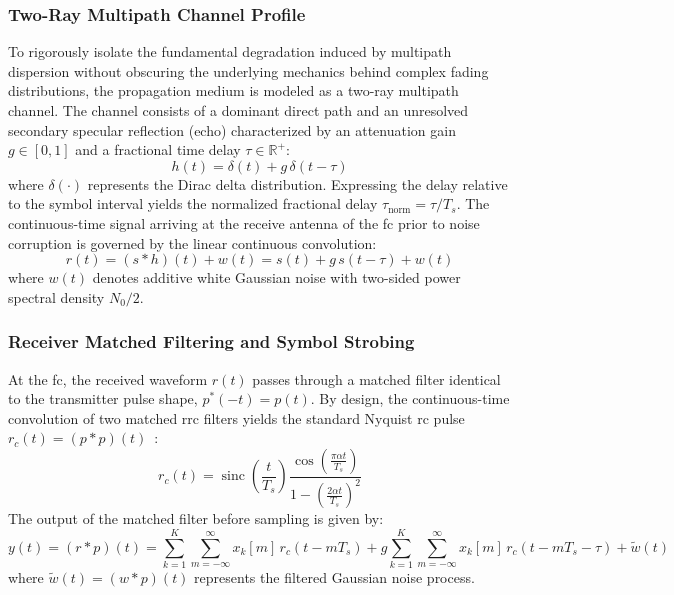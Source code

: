 \documentclass[Markos_Delaportas_1316.tex]{subfiles}
\begin{document}
\subsubsection{Two-Ray Multipath Channel Profile}
\label{subsubsec:two_ray_channel_profile}
To rigorously isolate the fundamental degradation induced by
multipath dispersion without obscuring the underlying
mechanics behind complex fading distributions, the propagation medium
is modeled as a two-ray multipath channel.
The channel consists of a dominant direct path and an unresolved
secondary specular reflection (echo) characterized
by an attenuation gain $g \in [0, 1]$ and a fractional time delay
$\tau \in \mathbb{R}^+$:
\begin{equation}
    h(t) = \delta(t) + g \, \delta(t - \tau)
    \label{eq:two_ray_impulse_response}
\end{equation}
where $\delta(\cdot)$ represents the Dirac delta distribution.
Expressing the delay relative to the symbol interval
yields the normalized fractional delay $\tau_{\text{norm}} = \tau /
T_s$. The continuous-time signal arriving at the
receive antenna of the \gls{fc} prior to noise corruption is governed
by the linear continuous convolution:
\begin{equation}
    r(t) = (s * h)(t) + w(t) = s(t) + g \, s(t - \tau) + w(t)
    \label{eq:continuous_received_waveform}
\end{equation}
where $w(t)$ denotes additive white Gaussian noise with two-sided
power spectral density $N_0 / 2$.

\subsubsection{Receiver Matched Filtering and Symbol Strobing}
\label{subsubsec:matched_filtering_strobing}
At the \gls{fc}, the received waveform $r(t)$ passes through a
matched filter identical to the transmitter pulse
shape, $p^*(-t) = p(t)$. By design, the continuous-time convolution
of two matched \gls{rrc} filters yields the
standard Nyquist \gls{rc} pulse $r_c(t) = (p *
p)(t)$~\cite{gandhi_implementation_2013,perez-neira_waveforms_2025}:
\begin{equation}
    r_c(t) = \operatorname{sinc}\left(\frac{t}{T_s}\right)
    \frac{\cos\left(\frac{\pi \alpha t}{T_s}\right)}{1 -
    \left(\frac{2\alpha t}{T_s}\right)^2}
    \label{eq:raised_cosine_analytical_formula}
\end{equation}
The output of the matched filter before sampling is given by:
\begin{equation}
    y(t) = (r * p)(t) = \sum_{k=1}^K \sum_{m=-\infty}^{\infty} x_k[m]
    \, r_c(t - m T_s) + g \sum_{k=1}^K \sum_{m=-\infty}^{\infty}
    x_k[m] \, r_c(t - m T_s - \tau) + \tilde{w}(t)
    \label{eq:matched_filter_output_continuous_isi}
\end{equation}
where $\tilde{w}(t) = (w * p)(t)$ represents the filtered Gaussian
noise process.
\end{document}
